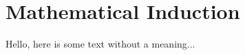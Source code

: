 \documentclass[../main.tex]{subfiles}
\begin{document}
\section{Mathematical Induction}

Hello, here is some text without a meaning...
\end{document}
